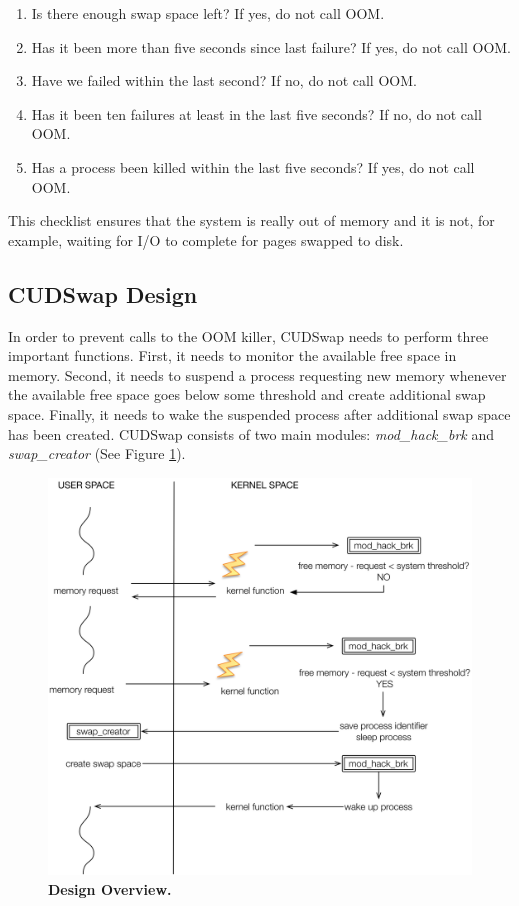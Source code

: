 \begin{enumerate}
\item Is there enough swap space left? If yes, do not call OOM.
\item Has it been more than five seconds since last failure? If yes, do not call OOM.
\item Have we failed within the last second? If no, do not call OOM.
\item Has it been ten failures at least in the last five seconds? If no, do not call OOM.
\item Has a process been killed within the last five seconds? If yes, do not call OOM.
\end{enumerate}

This checklist ensures that the system is really out of memory and it is not, for example, waiting for I/O to complete for pages swapped to disk.

\subsection{CUDSwap Design}\label{sub_cudswap_Design}

In order to prevent calls to the OOM killer, CUDSwap needs to perform three
important functions. First, it needs to monitor the available free space
in memory. Second, it needs to suspend a process requesting new memory
whenever the available free space goes below some threshold and create
additional swap space. Finally, it needs to wake the suspended process after
additional swap space has been created. CUDSwap consists of
two main modules: {\it mod\_hack\_brk} and {\it swap\_creator} (See
Figure \ref{cudswapfigure1}).

\begin{figure}[htbp]
\includegraphics[width=\columnwidth]{chapter_cudswap_figures/Figure_1.jpg}
\caption[Design Overview]{\textbf{Design Overview.}}
\label{cudswapfigure1}
\end{figure}

